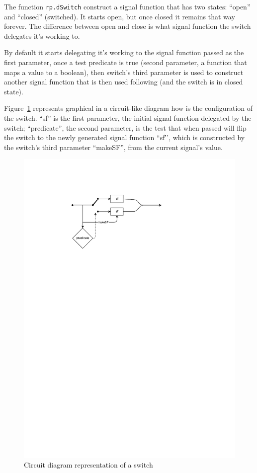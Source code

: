 \documentclass[notitlepage]{article}
\begin{document}
The function \texttt{rp.dSwitch} construct a signal function that has two
states: ``open'' and ``closed'' (switched). It starts open, but once closed it
remains that way forever. The difference between open and close is what signal
function the switch delegates it's working to.

By default it starts delegating it's working to the signal function passed as
the first parameter, once a test predicate is true (second parameter, a
function that maps a value to a boolean), then switch's third parameter is used
to construct another signal function that is then used following (and the switch
is in closed state).

Figure~\ref{fig:switch} represents graphical in a circuit-like diagram how is
the configuration of the switch. ``sf'' is the first parameter, the initial
signal function delegated by the switch; ``predicate'', the second parameter,
is the test that \- when passed \- will flip the switch to the newly generated
signal function ``sf\''', which is constructed by the switch's third parameter
``makeSF'', from the current signal's value.

\begin{figure}
    \centering
    \includegraphics[width=\linewidth,bb=0 0 219 129]{images/rp-switch.pdf}
    \caption{Circuit diagram representation of a switch}
    \label{fig:switch}
\end{figure}
\end{document}
